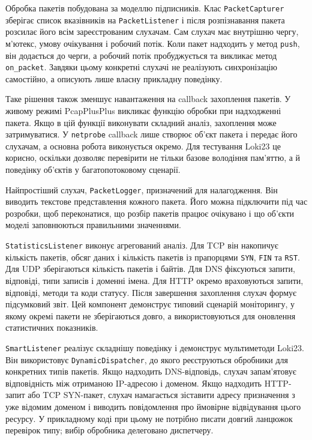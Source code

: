 Обробка пакетів побудована за моделлю підписників. Клас
\texttt{PacketCapturer} зберігає список вказівників на
\texttt{PacketListener} і після розпізнавання пакета розсилає його всім
зареєстрованим слухачам. Сам слухач має внутрішню чергу, м'ютекс, умову
очікування і робочий потік. Коли пакет надходить у метод \texttt{push},
він додається до черги, а робочий потік пробуджується та викликає метод
\texttt{on\_packet}. Завдяки цьому конкретні слухачі не реалізують
синхронізацію самостійно, а описують лише власну прикладну поведінку.

Таке рішення також зменшує навантаження на callback захоплення пакетів.
У живому режимі PcapPlusPlus викликає функцію обробки при надходженні
пакета. Якщо в цій функції виконувати складний аналіз, захоплення може
затримуватися. У \texttt{netprobe} callback лише створює об'єкт пакета і
передає його слухачам, а основна робота виконується окремо. Для
тестування Loki23 це корисно, оскільки дозволяє перевірити не тільки
базове володіння пам'яттю, а й поведінку об'єктів у багатопотоковому
сценарії.

Найпростіший слухач, \texttt{PacketLogger}, призначений для
налагодження. Він виводить текстове представлення кожного пакета. Його
можна підключити під час розробки, щоб переконатися, що розбір пакетів
працює очікувано і що об'єкти моделі заповнюються правильними
значеннями.

\texttt{StatisticsListener} виконує агрегований аналіз. Для TCP він
накопичує кількість пакетів, обсяг даних і кількість пакетів із
прапорцями \texttt{SYN}, \texttt{FIN} та \texttt{RST}. Для UDP
зберігаються кількість пакетів і байтів. Для DNS фіксуються запити,
відповіді, типи записів і доменні імена. Для HTTP окремо враховуються
запити, відповіді, методи та коди статусу. Після завершення захоплення
слухач формує підсумковий звіт. Цей компонент демонструє типовий
сценарій моніторингу, у якому окремі пакети не зберігаються довго, а
використовуються для оновлення статистичних показників.

\texttt{SmartListener} реалізує складнішу поведінку і демонструє
мультиметоди Loki23. Він використовує \texttt{DynamicDispatcher}, до
якого реєструються обробники для конкретних типів пакетів. Якщо
надходить DNS-відповідь, слухач запам'ятовує відповідність між отриманою
IP-адресою і доменом. Якщо надходить HTTP-запит або TCP SYN-пакет,
слухач намагається зіставити адресу призначення з уже відомим доменом і
виводить повідомлення про ймовірне відвідування цього ресурсу. У
прикладному коді при цьому не потрібно писати довгий ланцюжок перевірок
типу; вибір обробника делеговано диспетчеру.

